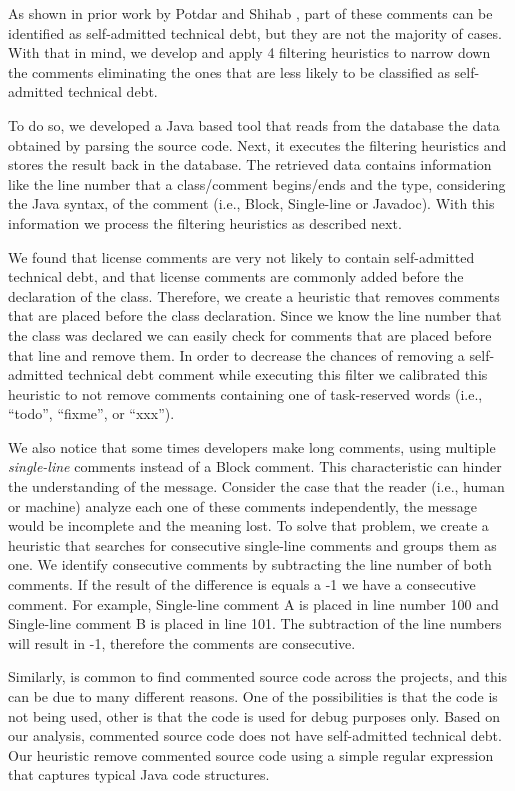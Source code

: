 As shown in prior work by Potdar and Shihab \cite{Potdar2014ICSME}, part of these comments can be identified as self-admitted technical debt, but they are not the majority of cases. With that in mind, we develop and apply 4 filtering heuristics to narrow down the comments eliminating the ones that are less likely to be classified as self-admitted technical debt.

To do so, we developed a Java based tool that reads from the database the data obtained by parsing the source code. Next, it executes the filtering heuristics and stores the result back in the database. The retrieved data contains information like the line number that a class/comment begins/ends and the type, considering the Java syntax, of the comment (i.e., Block, Single-line or Javadoc). With this information we process the filtering heuristics as described next.

We found that license comments are very not likely to contain self-admitted technical debt, and that license comments are commonly added before the declaration of the class. Therefore, we create a heuristic that removes comments that are placed before the class declaration. Since we know the line number that the class was declared we can easily check for comments that are placed before that line and remove them. In order to decrease the chances of removing a self-admitted technical debt comment while executing this filter we calibrated this heuristic to not remove comments containing one of task-reserved words (i.e., ``todo'', ``fixme'', or ``xxx'').

We also notice that some times developers make long comments, using multiple \emph{single-line} comments instead of a Block comment. This characteristic can hinder the understanding of the message. Consider the case that the reader (i.e., human or machine) analyze each one of these comments independently, the message would be incomplete and the meaning lost. To solve that problem, we create a heuristic that searches for consecutive single-line comments and groups them as one. We identify consecutive comments by subtracting the line number of both comments. If the result of the difference is equals a -1 we have a consecutive comment. For example, Single-line comment A is placed in line number 100 and Single-line comment B is placed in line 101. The subtraction of the line numbers will result in -1, therefore the comments are consecutive.
 
Similarly, is common to find commented source code across the projects, and this can be due to many different reasons. One of the possibilities is that the code is not being used, other is that the code is used for debug purposes only. Based on our analysis, commented source code does not have self-admitted technical debt. Our heuristic remove commented source code using a simple regular expression that captures typical Java code structures.

